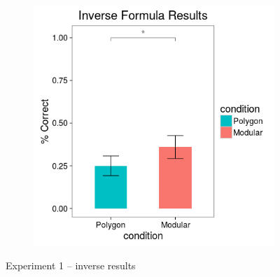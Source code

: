 \documentclass[man,10pt]{apa6}
\begin{document}
\begin{figure}[H]
\begin{subfigure}[c]{0.3\textwidth}
\end{subfigure}
~
\begin{subfigure}[c]{0.3\textwidth}
\centering
\includegraphics[width=\textwidth]{figures/1/in_f_r.png}
\end{subfigure}
\caption{Experiment 1 -- inverse results}
\label{ex1_in}
\end{figure}\noindent 
\end{document}
